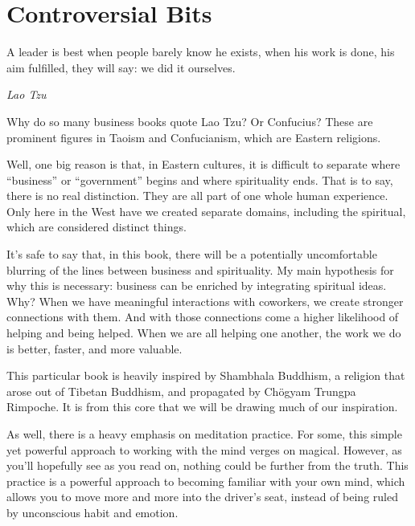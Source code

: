 \chapter{Controversial Bits}
\epigraph{A leader is best when people barely know he exists, when his work is done, his aim fulfilled, they will say: we did it ourselves.}{\textit{Lao Tzu}}

Why do so many business books quote Lao Tzu? Or Confucius? These are prominent figures in Taoism
and Confucianism, which are Eastern religions.

Well, one big reason is that, in Eastern cultures, it is difficult to separate where ``business'' or ``government''
begins and where spirituality ends. That is to say, there is no real distinction. They are all part of one whole 
human experience. Only here in the West have we created separate domains, including the spiritual, which 
are considered distinct things.

It's safe to say that, in this book, there will be a potentially uncomfortable blurring of the lines between business
and spirituality. My main hypothesis for why this is necessary: business can be enriched by integrating spiritual
ideas. Why? When we have meaningful interactions with coworkers, we create stronger connections with them.
And with those connections come a higher likelihood of helping and being helped. When we are all helping
one another, the work we do is better, faster, and more valuable.

This particular book is heavily inspired by Shambhala Buddhism, a religion that arose out of Tibetan Buddhism,
and propagated by Ch{\"o}gyam Trungpa Rimpoche. It is from this core that we will be drawing
much of our inspiration.

As well, there is a heavy emphasis on meditation practice. For some, this simple yet powerful approach to 
working with the mind verges on magical. However, as you'll hopefully see as you read on, nothing
could be further from the truth. This practice is a powerful approach to becoming familiar with your own
mind, which allows you to move more and more into the driver's seat, instead of being ruled by unconscious
habit and emotion.